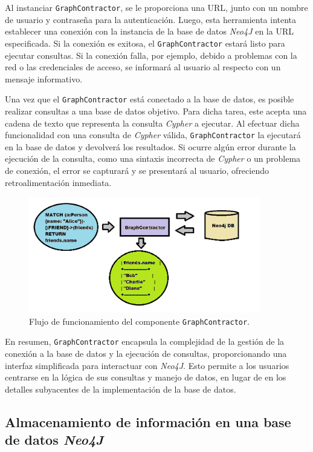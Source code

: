 Al instanciar \texttt{GraphContractor}, se le proporciona una URL, junto con un nombre de usuario y contraseña para la autenticación. Luego, esta herramienta intenta establecer una conexión con la instancia de la base de datos \textit{Neo4J} en la URL especificada. Si la conexión es exitosa, el \texttt{GraphContractor} estará listo para ejecutar consultas. Si la conexión falla, por ejemplo, debido a problemas con la red o las credenciales de acceso, se informará al usuario al respecto con un mensaje informativo.

Una vez que el \texttt{GraphContractor} está conectado a la base de datos, es posible realizar consultas a una base de datos objetivo. Para dicha tarea, este acepta una cadena de texto que representa la consulta \textit{Cypher} a ejecutar. Al efectuar dicha funcionalidad con una consulta de \textit{Cypher} válida, \texttt{GraphContractor} la ejecutará en la base de datos y devolverá los resultados. Si ocurre algún error durante la ejecución de la consulta, como una sintaxis incorrecta de \textit{Cypher} o un problema de conexión, el error se capturará y se presentará al usuario, ofreciendo retroalimentación inmediata.

\begin{figure}[H]\label{gcimage}
	\centering
	\includegraphics[width = 0.9\textwidth]{./Graphics/graph_contractor}
	\caption{Flujo de funcionamiento del componente \texttt{GraphContractor}.}
\end{figure}

En resumen, \texttt{GraphContractor} encapsula la complejidad de la gestión de la conexión a la base de datos y la ejecución de consultas, proporcionando una interfaz simplificada para interactuar con \textit{Neo4J}. Esto permite a los usuarios centrarse en la lógica de sus consultas y manejo de datos, en lugar de en los detalles subyacentes de la implementación de la base de datos.

\subsection{Almacenamiento de información en una base de datos \textit{Neo4J}} \label{dbseeding}

